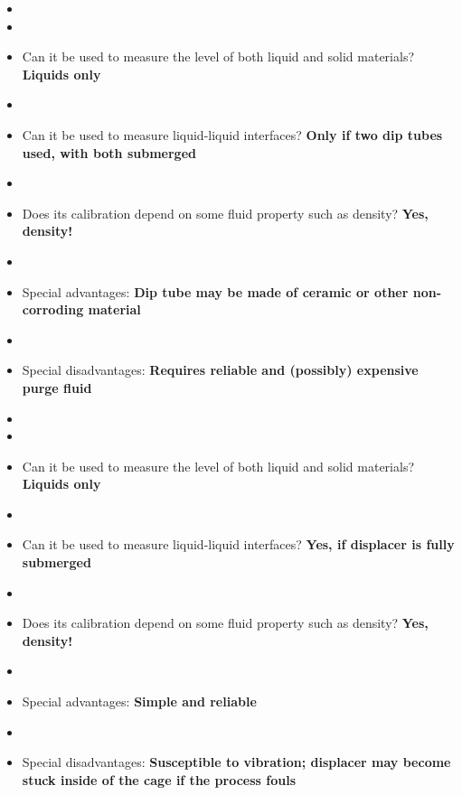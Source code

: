\begin{itemize}
\goodbreak
\item{} 
\item\item{} Can it be used to measure the level of both liquid and solid materials? {\bf Liquids only}
\item\item{} Can it be used to measure liquid-liquid interfaces? {\bf Only if two dip tubes used, with both submerged}
\item\item{} Does its calibration depend on some fluid property such as density? {\bf Yes, density!}
\item\item{} Special advantages: {\bf Dip tube may be made of ceramic or other non-corroding material}
\item\item{} Special disadvantages: {\bf Requires reliable and (possibly) expensive purge fluid}
\end{itemize}

\vskip 10pt

\begin{itemize}
\goodbreak
\item{} 
\item\item{} Can it be used to measure the level of both liquid and solid materials? {\bf Liquids only}
\item\item{} Can it be used to measure liquid-liquid interfaces? {\bf Yes, if displacer is fully submerged}
\item\item{} Does its calibration depend on some fluid property such as density? {\bf Yes, density!}
\item\item{} Special advantages: {\bf Simple and reliable}
\item\item{} Special disadvantages: {\bf Susceptible to vibration; displacer may become stuck inside of the cage if the process fouls}
\end{itemize}

\vskip 10pt

